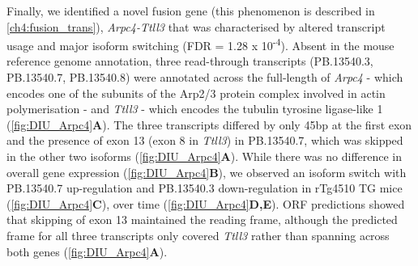 Finally, we identified a novel fusion gene (this phenomenon is described in \cref{ch4:fusion_trans}), \textit{Arpc4-Ttll3} that was characterised by altered transcript usage and major isoform switching (FDR = 1.28 x 10\textsuperscript{-4}). Absent in the mouse reference genome annotation, three read-through transcripts (PB.13540.3, PB.13540.7, PB.13540.8) were annotated across the full-length of \textit{Arpc4} - which encodes one of the subunits of the Arp2/3 protein complex involved in actin polymerisation - and \textit{Ttll3} - which encodes the tubulin tyrosine ligase-like 1 (\cref{fig:DIU_Arpc4}\textbf{A}). The three transcripts differed by only 45bp at the first exon and the presence of exon 13 (exon 8 in \textit{Ttll3}) in PB.13540.7, which was skipped in the other two isoforms (\cref{fig:DIU_Arpc4}\textbf{A}). While there was no difference in overall gene expression (\cref{fig:DIU_Arpc4}\textbf{B}), we observed an isoform switch with PB.13540.7 up-regulation and  PB.13540.3 down-regulation in rTg4510 TG mice (\cref{fig:DIU_Arpc4}\textbf{C}), over time (\cref{fig:DIU_Arpc4}\textbf{D,E}). ORF predictions showed that skipping of exon 13 maintained the reading frame, although the predicted frame for all three transcripts only covered \textit{Ttll3} rather than spanning across both genes (\cref{fig:DIU_Arpc4}\textbf{A}).  

